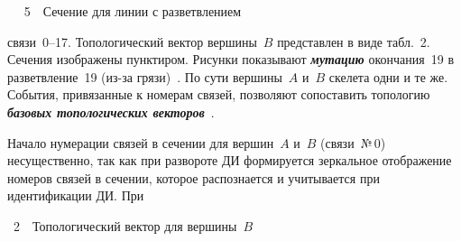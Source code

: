 \begin{multicols}{2}
\bigskip
\addtocounter{table}{1}


\begin{center} %
\mbox{%
\epsfxsize=74.915mm
}
\vspace*{12pt}
{{\figurename~5}\ \ \small{Сечение для линии с разветвлением}}
\end{center}


\addtocounter{figure}{1}

\noindent
 связи~0--17. Топологический вектор
вершины~$B$ представлен в виде табл.~2. Сечения изображены пунктиром. Рисунки
показывают {\bfseries\textit{мутацию}} окончания~19 в разветвление~19 (из-за
грязи)~\cite{3gud}. По сути вершины~$A$ и~$B$ скелета одни и те же. События, привязанные к
номерам связей, позволяют сопоставить топологию {\bfseries\textit{базовых топологических
векторов}}~\cite{3gud}.

Начало нумерации связей в сечении для вершин~$A$ и~$B$ (связи~№\,0) несущественно, так как
при развороте ДИ формируется зеркальное отоб\-ра\-же\-ние номеров связей в сечении, которое
распознается и учитывается при идентификации ДИ. При\linebreak\vspace*{-12pt}
\noindent
\begin{center}
\vspace*{1pt}
\parbox{60mm}{{{\tablename~2}\ \ \small{Топологический вектор для вершины~$B$}}}


\end{center}
\end{multicols}
